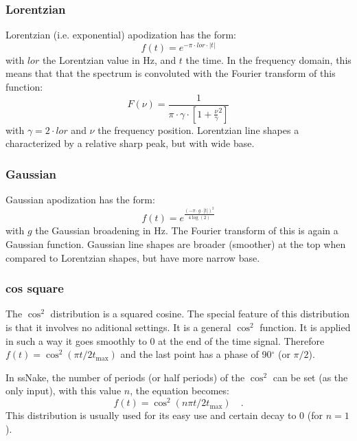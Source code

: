 \documentclass[11pt,a4paper]{article}
\begin{document}

\subsubsection{Lorentzian}
Lorentzian (i.e. exponential) apodization has the form:
\begin{equation}
  f(t) = e^{-\pi \cdot lor \cdot |t|}
\end{equation}
with $lor$ the Lorentzian value in Hz, and $t$ the time. In the frequency domain, this means that that the
spectrum is convoluted with the Fourier transform of this function:
\begin{equation}
  F(\nu) = \frac{1}{\pi \cdot \gamma \cdot \left[ 1 + \frac{\nu}{\gamma}^2 \right]}
\end{equation}
with $\gamma = 2 \cdot lor$ and $\nu$ the frequency position. Lorentzian line shapes a characterized by a relative sharp peak, but with wide base.

\subsubsection{Gaussian}
Gaussian apodization has the form:
\begin{equation}
  f(t) = e^{\frac{(-\pi \cdot g \cdot |t|)^2}{4 \log(2)} }
\end{equation}
with $g$ the Gaussian broadening in Hz. The Fourier transform of this is again a Gaussian function. Gaussian line shapes are broader (smoother) at the top when compared to Lorentzian shapes, but have more narrow base.

\subsubsection{cos square}
The $\cos^2$ distribution is a squared cosine. The special feature of this distribution is that it involves no aditional settings. It is a general $\cos^2$ function. It is applied in such a way it goes smoothly to 0 at the end of the time signal. Therefore $f(t) = \cos^2(\pi t/2t_\text{max})$ and the last point has a phase of 90$^\circ$ (or $\pi/2$).

In ssNake, the number of periods (or half periods) of the $\cos^2$ can be set (as the only input), with this value $n$, the equation becomes:
\begin{equation}
  f(t) = \cos^2(n\pi  t/2t_\text{max}) \quad .
\end{equation}
This distribution is usually used for its easy use and certain decay to 0 (for $n = 1$).
\end{document}
